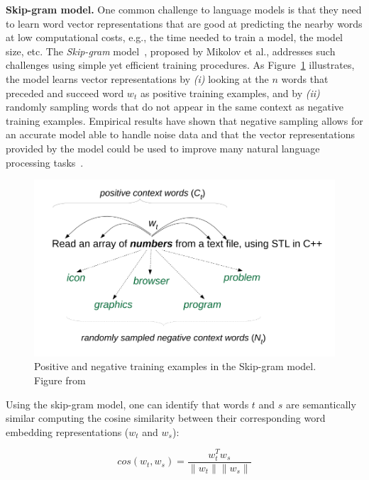 \smallskip
\begin{hangparas}{.0in}{0}
    {\small \textbf{ Skip-gram model.}} One common challenge to language models is that they need to learn word vector representations that are good at predicting the nearby words at low computational costs, e.g., the time needed to train a model, the model size, etc.
    The \textit{Skip-gram} model~\cite{Mikolov2013}, proposed by Mikolov et al., addresses such challenges using simple yet efficient training procedures. As Figure~\ref{fig:skip-gram-example} illustrates, the model learns vector representations by \textit{(i)} looking at the $n$ words that preceded and succeed word $w_t$
     as positive training examples, and by \textit{(ii)} randomly sampling words that do not appear in the same context as negative training examples. Empirical results have shown that negative sampling allows for an accurate model able to handle noise data and that 
     the vector representations provided by the model could be used to improve many natural language processing tasks~\cite{mikolov2013efficient}.
\end{hangparas}



\begin{figure}[H]
    \centering
    \includegraphics[width=.65\linewidth]{fig/cp5/ye-skip-gram-example}
    \caption{Positive and negative training examples in the Skip-gram model. Figure from~\cite{Ye2016}}
    \label{fig:skip-gram-example}
\end{figure}



Using the skip-gram model, one can identify that words $t$ and $s$ are semantically similar 
computing the cosine similarity between their corresponding word embedding representations ($w_t$ and $w_s$):



\begin{equation}
    cos(w_t,w_s) = \frac{w_t^Tw_s}{\|w_t\| \|w_s\|}
    \label{eq:word-sim}
\end{equation}






